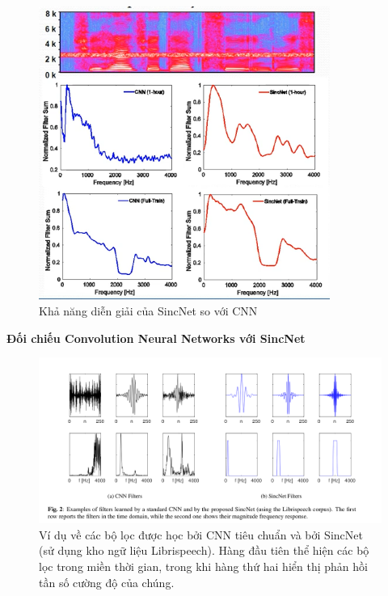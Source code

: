 \documentclass{article}
\begin{document}
\begin{itemize}
		\begin{figure}[H]
			\centering
			\includegraphics[width=0.85\textwidth]{images/interpretability_2.png}
			\caption{Khả năng diễn giải của SincNet so với CNN}
			\label{fig:writing-thesis}
		\end{figure}
	\end{itemize}

	\textbf{Đối chiếu Convolution Neural Networks với SincNet}
	\begin{figure}[H]
		\centering
		\includegraphics[width=1\textwidth]{images/cnn_filters_sincnet_filters.png}
		\caption{Ví dụ về các bộ lọc được học bởi CNN tiêu chuẩn và bởi SincNet (sử dụng kho ngữ liệu Librispeech). Hàng đầu tiên thể hiện các bộ lọc trong miền thời gian, trong khi hàng thứ hai hiển thị phản hồi tần số cường độ của chúng.}
		\label{fig:writing-thesis}
	\end{figure}
	
\end{document}
